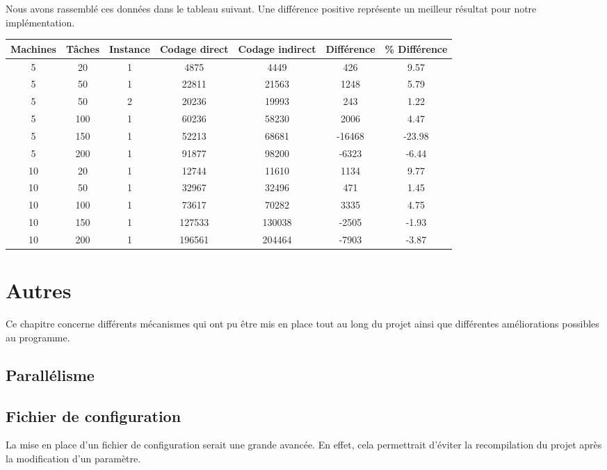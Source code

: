 \documentclass[hideweeklyreports]{polytech/polytech}
\begin{document}
			Nous avons rassemblé ces données dans le tableau suivant. Une différence positive représente un meilleur résultat pour notre implémentation.

			\begin{centering}
				\begin{tabularx}{\textwidth}{|c|c|c||c|c||c|c|}
					\hline
					Machines & Tâches & Instance & Codage direct & Codage indirect & Différence & \% Différence\\\hline\hline
					5 & 20 & 1 & 4875 & 4449 & 426 & 9.57\\\hline
					5 & 50 & 1 & 22811 & 21563 & 1248 & 5.79\\\hline
					5 & 50 & 2 & 20236 & 19993 & 243 & 1.22\\\hline
					5 & 100 & 1 & 60236 & 58230 & 2006 & 4.47\\\hline
					5 & 150 & 1 & 52213 & 68681 & -16468 & -23.98\\\hline
					5 & 200 & 1 & 91877 & 98200 & -6323 & -6.44\\\hline
					10 & 20 & 1 & 12744 & 11610 & 1134 & 9.77\\\hline
					10 & 50 & 1 & 32967 & 32496 & 471 & 1.45\\\hline
					10 & 100 & 1 & 73617 & 70282 & 3335 & 4.75\\\hline
					10 & 150 & 1 & 127533 & 130038 & -2505 & -1.93\\\hline
					10 & 200 & 1 & 196561 & 204464 & -7903 & -3.87\\\hline
				\end{tabularx}
			\end{centering}
	
	\chapter{Autres}
		Ce chapitre concerne différents mécanismes qui ont pu être mis en place tout au long du projet ainsi que différentes améliorations possibles au programme.
		
		\section{Parallélisme} %
		
		\section{Fichier de configuration}
			La mise en place d'un fichier de configuration serait une grande avancée. En effet, cela permettrait d'éviter la recompilation du projet après la modification d'un paramètre.
			
\end{document}
